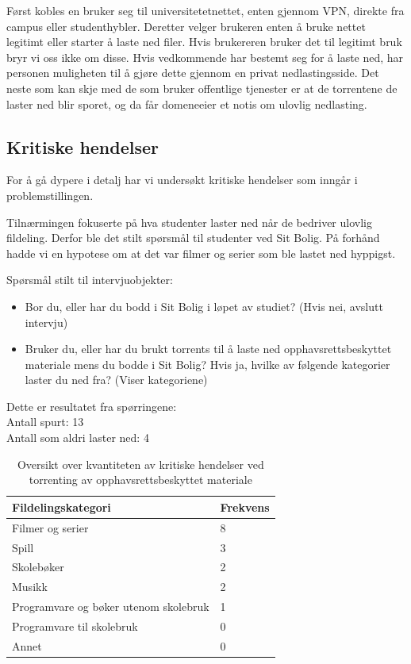 Først kobles en bruker seg til universitetetnettet, enten gjennom VPN, direkte fra campus eller studenthybler. Deretter velger brukeren enten å bruke nettet legitimt eller starter å laste ned filer. Hvis brukereren bruker det til legitimt bruk bryr vi oss ikke om disse. Hvis vedkommende har bestemt seg for å laste ned, har personen muligheten til å gjøre dette gjennom en privat nedlastingsside. Det neste som kan skje med de som bruker offentlige tjenester er at de torrentene de laster ned blir sporet, og da får domeneeier et notis om ulovlig nedlasting.

\subsection{Kritiske hendelser}
For å gå dypere i detalj har vi undersøkt kritiske hendelser som inngår i problemstillingen. 

Tilnærmingen fokuserte på hva studenter laster ned når de bedriver ulovlig fildeling. Derfor ble det stilt spørsmål til studenter ved Sit Bolig. På forhånd hadde vi en hypotese om at det var filmer og serier som ble lastet ned hyppigst.

Spørsmål stilt til intervjuobjekter:
\begin{itemize}
    \item Bor du, eller har du bodd i Sit Bolig i løpet av studiet? (Hvis nei, avslutt intervju)
    \item Bruker du, eller har du brukt torrents til å laste ned opphavsrettsbeskyttet materiale mens du bodde i Sit Bolig? Hvis ja, hvilke av følgende kategorier laster du ned fra? (Viser kategoriene)
\end{itemize}

\noindent Dette er resultatet fra spørringene: \\
\indent Antall spurt: 13 \\
\indent Antall som aldri laster ned: 4
\begin{table} [H]
    \caption[Frekvensen av ulike kategorier av nedlasting]{Oversikt over kvantiteten av kritiske hendelser ved torrenting av opphavsrettsbeskyttet materiale}
    \begin{tabular}{ | m{18em} | m{18em} | }
        \hline
            \cellcolor{yellow} Fildelingskategori & \cellcolor{yellow} Frekvens \\
        \hline
            Filmer og serier & 8  \\
        \hline
            Spill & 3 \\
        \hline
            Skolebøker & 2 \\
        \hline
            Musikk & 2 \\
        \hline
            Programvare og bøker utenom skolebruk & 1 \\
        \hline
            Programvare til skolebruk & 0 \\
        \hline
            Annet & 0 \\
        \hline
    \end{tabular}
    \label{kritisk_tabell_1}
\end{table}

